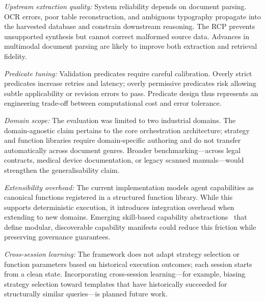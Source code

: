 \documentclass[largeformat]{interact}
\begin{document}
 \vspace{1.0em}
    \noindent \textit{Upstream extraction quality:} System reliability depends on document parsing. OCR errors, poor table reconstruction, and ambiguous typography propagate into the harvested database and constrain downstream reasoning. The RCP prevents unsupported synthesis but cannot correct malformed source data. Advances in multimodal document parsing are likely to improve both extraction and retrieval fidelity.
\vspace{0.5em}

    \noindent \textit{Predicate tuning:} Validation predicates require careful calibration. Overly strict predicates increase retries and latency; overly permissive predicates risk allowing subtle applicability or revision errors to pass. Predicate design thus represents an engineering trade-off between computational cost and error tolerance.
\vspace{0.5em}

    \noindent \textit{Domain scope:} The evaluation was limited to two industrial domains. The domain-agnostic claim pertains to the core orchestration architecture; strategy and function libraries require domain-specific authoring and do not transfer automatically across document genres. Broader benchmarking---across legal contracts, medical device documentation, or legacy scanned manuals---would strengthen the generalisability claim.
\vspace{0.5em}

    \noindent \textit{Extensibility overhead:} The current implementation models agent capabilities as canonical functions registered in a structured function library. While this supports deterministic execution, it introduces integration overhead when extending to new domains. Emerging skill-based capability abstractions~\cite{agentskills2024} that define modular, discoverable capability manifests could reduce this friction while preserving governance guarantees.
\vspace{0.5em}

    \noindent \textit{Cross-session learning:} The framework does not adapt strategy selection or function parameters based on historical execution outcomes; each session starts from a clean state. Incorporating cross-session learning---for example, biasing strategy selection toward templates that have historically succeeded for structurally similar queries---is planned future work.


\end{document}
